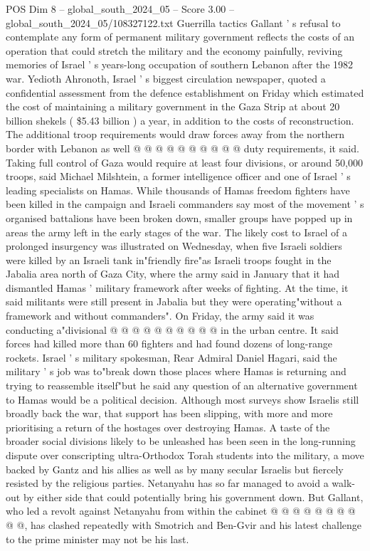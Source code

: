 \begin{textsample}{POS Dim 8 – global\_south\_2024\_05 – Score 3.00 – global\_south\_2024\_05/108327122.txt}
Guerrilla tactics Gallant ' s refusal to contemplate any form of permanent military government reflects the costs of an operation that could stretch the military and the economy painfully, reviving memories of Israel ' s years-long occupation of southern Lebanon after the 1982 war.
Yedioth Ahronoth, Israel ' s biggest circulation newspaper, quoted a confidential assessment from the defence establishment on Friday which estimated the cost of maintaining a military government in the Gaza Strip at about 20 billion shekels ( \$5.43 billion ) a year, in addition to the costs of reconstruction.
The additional troop requirements would draw forces away from the northern border with Lebanon as well @ @ @ @ @ @ @ @ @ @ duty requirements, it said.
Taking full control of Gaza would require at least four divisions, or around 50,000 troops, said Michael Milshtein, a former intelligence officer and one of Israel ' s leading specialists on Hamas.
While thousands of Hamas freedom fighters have been killed in the campaign and Israeli commanders say most of the movement ' s organised battalions have been broken down, smaller groups have popped up in areas the army left in the early stages of the war.
The likely cost to Israel of a prolonged insurgency was illustrated on Wednesday, when five Israeli soldiers were killed by an Israeli tank in"friendly fire"as Israeli troops fought in the Jabalia area north of Gaza City, where the army said in January that it had dismantled Hamas ' military framework after weeks of fighting.
At the time, it said militants were still present in Jabalia but they were operating"without a framework and without commanders".
On Friday, the army said it was conducting a"divisional @ @ @ @ @ @ @ @ @ @ in the urban centre.
It said forces had killed more than 60 fighters and had found dozens of long-range rockets.
Israel ' s military spokesman, Rear Admiral Daniel Hagari, said the military ' s job was to"break down those places where Hamas is returning and trying to reassemble itself"but he said any question of an alternative government to Hamas would be a political decision.
Although most surveys show Israelis still broadly back the war, that support has been slipping, with more and more prioritising a return of the hostages over destroying Hamas.
A taste of the broader social divisions likely to be unleashed has been seen in the long-running dispute over conscripting ultra-Orthodox Torah students into the military, a move backed by Gantz and his allies as well as by many secular Israelis but fiercely resisted by the religious parties.
Netanyahu has so far managed to avoid a walk-out by either side that could potentially bring his government down.
But Gallant, who led a revolt against Netanyahu from within the cabinet @ @ @ @ @ @ @ @ @ @, has clashed repeatedly with Smotrich and Ben-Gvir and his latest challenge to the prime minister may not be his last.

\end{textsample}
